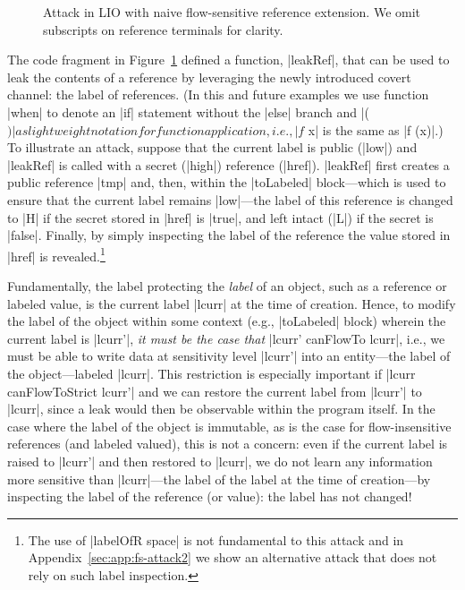 \begin{figure}[t]
\small
{}
\cut{$}
\caption{Attack in LIO with naive flow-sensitive reference extension. We omit
subscripts on reference terminals for clarity.  \label{fig:fs-attack}}
\end{figure}

The code fragment in Figure~\ref{fig:fs-attack} defined a function,
|leakRef|, that can be used to leak the contents of a reference by
leveraging the newly introduced covert channel: the label of references.
%
(In this and future examples we use function |when| to denote an |if|
statement without the |else| branch and |($)| as lightweight notation
for function application, i.e., |f $ x| is the same as |f (x)|.)
%
To illustrate an attack, suppose that the current label is public
(|low|) and |leakRef| is called with a secret (|high|) reference
(|href|).
%
|leakRef| first creates a public reference |tmp| and, then, within the
|toLabeled| block---which is used to ensure that the current label remains
|low|---the label of this reference is changed to |H| if the secret stored in
|href| is |true|, and left intact (|L|) if the secret is |false|.
%
Finally, by simply inspecting the label of the reference the value stored in
|href| is revealed.\footnote{%
The use of |labelOfR space| is not fundamental to this attack and in
Appendix~\ref{sec:app:fs-attack2} we show an alternative attack that
does not rely on such label inspection.
}

Fundamentally, the label protecting the \emph{label} of an object,
such as a reference or labeled value, is the current label |lcurr| at
the time of creation.
%
Hence, to modify the label of the object within some context (e.g., |toLabeled|
block) wherein the current label is |lcurr'|, \emph{it must be the case that} |lcurr'
canFlowTo lcurr|, i.e., we must be able to write data at sensitivity level
|lcurr'| into an entity---the label of the object---labeled |lcurr|.
%
This restriction is especially important if |lcurr canFlowToStrict
lcurr'| and we can restore the current label from |lcurr'| to |lcurr|, 
since a leak would then be observable within the program itself.
%
In the case where the label of the object is immutable, as is the case for
flow-insensitive references (and labeled valued), this is not a concern: even if
the current label is raised to |lcurr'| and then restored to |lcurr|, we do not
learn any information more sensitive than |lcurr|---the label of the label at the
time of creation---by inspecting the label of the reference (or
value): the label has not changed!
%

